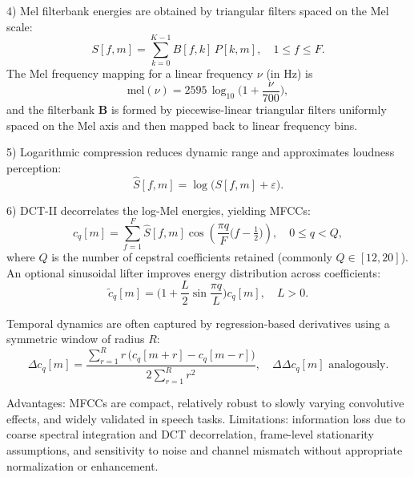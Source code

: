 4) Mel filterbank energies are obtained by triangular filters spaced on the Mel scale:
\begin{equation}\label{eq:mel}
S[f,m] = \sum_{k=0}^{K-1} B[f,k] \, P[k,m], \quad 1 \le f \le F.
\end{equation}
The Mel frequency mapping for a linear frequency \(\nu\) (in Hz) is
\begin{equation}\label{eq:mel-scale}
\mathrm{mel}(\nu) = 2595\, \log_{10}\!\bigg(1 + \frac{\nu}{700}\bigg),
\end{equation}
and the filterbank \(\mathbf{B}\) is formed by piecewise-linear triangular filters uniformly spaced on the Mel axis and then mapped back to linear frequency bins.

5) Logarithmic compression reduces dynamic range and approximates loudness perception:
\begin{equation}\label{eq:logmel}
\widehat{S}[f,m] = \log\big(S[f,m] + \varepsilon\big).
\end{equation}

6) DCT-II decorrelates the log-Mel energies, yielding MFCCs:
\begin{equation}\label{eq:dct}
c_q[m] = \sum_{f=1}^{F} \widehat{S}[f,m] \cos\!\left( \frac{\pi q}{F} \Big(f - \tfrac{1}{2}\Big) \right), \quad 0 \le q < Q,
\end{equation}
where \(Q\) is the number of cepstral coefficients retained (commonly \(Q\in[12,20]\)). An optional sinusoidal lifter improves energy distribution across coefficients:
\begin{equation}\label{eq:lifter}
\widetilde{c}_q[m] = \Big(1 + \frac{L}{2} \sin\!\frac{\pi q}{L}\Big) c_q[m], \quad L>0.
\end{equation}

Temporal dynamics are often captured by regression-based derivatives using a symmetric window of radius \(R\):
\begin{equation}\label{eq:delta}
\Delta c_q[m] = \frac{\sum_{r=1}^{R} r\, \big(c_q[m+r] - c_q[m-r]\big)}{2 \sum_{r=1}^{R} r^2}, \quad \Delta\!\Delta c_q[m] \text{ analogously.}
\end{equation}

Advantages: MFCCs are compact, relatively robust to slowly varying convolutive effects, and widely validated in speech tasks. Limitations: information loss due to coarse spectral integration and DCT decorrelation, frame-level stationarity assumptions, and sensitivity to noise and channel mismatch without appropriate normalization or enhancement.

